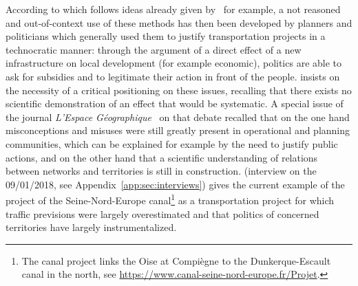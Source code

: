 According to \cite{offner1993effets} which follows ideas already given by~\cite{franccois1977autoroutes} for example, a not reasoned and out-of-context use of these methods has then been developed by planners and politicians which generally used them to justify transportation projects in a technocratic manner: through the argument of a direct effect of a new infrastructure on local development (for example economic), politics are able to ask for subsidies and to legitimate their action in front of the people. \cite{offner1993effets} insists on the necessity of a critical positioning on these issues, recalling that there exists no scientific demonstration of an effect that would be systematic. A special issue of the journal \emph{L'Espace Géographique}~\cite{espacegeo2014effets} on that debate recalled that on the one hand misconceptions and misuses were still greatly present in operational and planning communities, which can be explained for example by the need to justify public actions, and on the other hand that a scientific understanding of relations between networks and territories is still in construction.  (interview on the 09/01/2018, see Appendix~\ref{app:sec:interviews}) gives the current example of the project of the Seine-Nord-Europe canal\footnote{The canal project links the Oise at Compiègne to the Dunkerque-Escault canal in the north, see \url{https://www.canal-seine-nord-europe.fr/Projet}.} as a transportation project for which traffic previsions were largely overestimated and that politics of concerned territories have largely instrumentalized.







